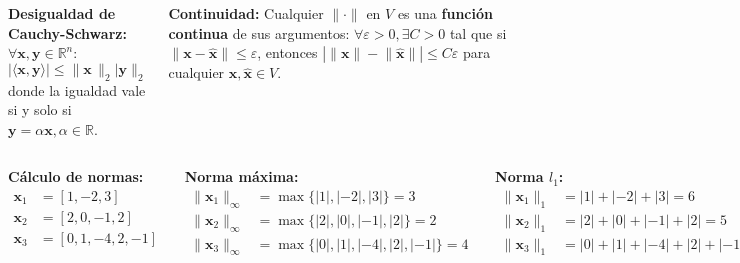 \documentclass[9pt, aspectratio=169]{beamer}
\begin{document}
\begin{frame}
\begin{columns}[t]
\textbf{Desigualdad de Cauchy-Schwarz:} $\forall \bm{x}, \bm{y} \in \mathbb{R}^n$:
\[ | \langle \bm{x}, \bm{y} \rangle | \leq \lVert \bm{x} \, \rVert_2 \lvert \bm{y} \rVert_2 \]
donde la igualdad vale si y solo si $\bm{y} = \alpha \bm{x}, \alpha \in \mathbb{R}$.

\textbf{Continuidad:} Cualquier $\lVert \cdot \rVert$ en $V$ es una \textbf{función continua} de sus argumentos: $\forall \varepsilon > 0, \exists C > 0$ tal que si $\lVert \bm{x} - \hat{\bm{x}} \rVert \leq \varepsilon$, entonces $| \lVert \bm{x} \rVert - \lVert \hat{\bm{x}} \rVert | \leq C \varepsilon$ para cualquier $\bm{x}, \hat{\bm{x}} \in V$.
\end{columns}
\end{frame}

\begin{frame}
\begin{columns}[t]
\textbf{Cálculo de normas:}
\begin{align*}
  \bm{x}_1 &= [1, -2, 3] \\
  \bm{x}_2 &= [2, 0, -1, 2] \\
  \bm{x}_3 &= [0, 1, -4, 2, -1] \\
\end{align*}

\textbf{Norma máxima:}
\begin{align*}
\lVert  \bm{x}_1 \rVert_{\infty} &= \max \{|1|, |-2|, |3|\} = 3\\
\lVert  \bm{x}_2 \rVert_{\infty} &= \max \{|2|, |0|, |-1|, |2|\} = 2\\
\lVert  \bm{x}_3 \rVert_{\infty} &= \max \{|0|, |1|, |-4|, |2|, |-1|\} = 4 \\
\end{align*}

\textbf{Norma $l_1$:}
\begin{align*}
\lVert  \bm{x}_1 \rVert_1 &=  |1| + |-2| + |3| = 6\\
\lVert  \bm{x}_2 \rVert_1 &= |2| + |0| + |-1| + |2|= 5\\
\lVert  \bm{x}_3 \rVert_1 &= |0| +|1| + |-4| + |2| + |-1| = 8 \\
\end{align*}

\textbf{Norma $l_2$:}
\begin{align*}
  \lVert  \bm{x}_1 \rVert_2 &= \sqrt{|1|^2 + |-2|^2 + |3|^2} = \sqrt{14} \approx 3.74\\
  \lVert  \bm{x}_2 \rVert_2 &= \sqrt{|2|^2 + |0|^2 + |-1|^2 + |2|^2}= \sqrt{9} =3\\
  \lVert  \bm{x}_3 \rVert_2 &= \sqrt{|0|^2 +|1|^2 + |-4|^2 + |2|^2 + |-1|^2} = \sqrt{22} \approx 4.69\\
\end{align*}
\end{columns}
\end{frame}
\end{document}
